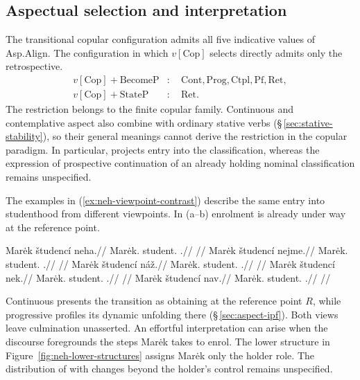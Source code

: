 \subsection{Aspectual selection and interpretation}
\label{sec:neh-selection}

The transitional copular configuration admits all five indicative values
of Asp.Align. The configuration in which $v[\mathrm{Cop}]$ selects
 directly admits only the retrospective.
\[
\begin{aligned}
 v[\mathrm{Cop}]+\mathrm{BecomeP}
   &:\quad \mathrm{Cont,Prog,Ctpl,Pf,Ret},\\
 v[\mathrm{Cop}]+\mathrm{StateP}
   &:\quad \mathrm{Ret}.
\end{aligned}
\]
The restriction belongs to the finite copular family. Continuous
and contemplative aspect also combine with ordinary stative verbs
(§\,\ref{sec:stative-stability}), so their general meanings cannot
derive the restriction in the copular paradigm. In particular,
 projects entry into the classification, whereas the expression
of prospective continuation of an already holding nominal classification
remains unspecified.

The examples in (\ref{ex:neh-viewpoint-contrast}) describe the same
entry into studenthood from different viewpoints. In (a--b) enrolment
is already under way at the reference point.

\pex\label{ex:neh-viewpoint-contrast}
\a
\begingl
\gla Marėk študencí neha.//
\glb Marėk.\Dir{} student.\Ind{} \Cop{}.\Cont{}//
\glft {}
//
\endgl
\a
\begingl
\gla Marėk študencí nejme.//
\glb Marėk.\Dir{} student.\Ind{} \Cop{}.\Prog{}//
\glft {}
//
\endgl
\a
\begingl
\gla Marėk študencí náž.//
\glb Marėk.\Dir{} student.\Ind{} \Cop{}.\Ctpl{}//
\glft {}
//
\endgl
\a
\begingl
\gla Marėk študencí nek.//
\glb Marėk.\Dir{} student.\Ind{} \Cop{}.\Pf{}//
\glft {}
//
\endgl
\a
\begingl
\gla Marėk študencí nav.//
\glb Marėk.\Dir{} student.\Ind{} \Cop{}.\Ret{}//
\glft {}
//
\endgl
\xe

\noindent Continuous  presents the transition as obtaining at
the reference point $R$, while progressive  profiles its
dynamic unfolding there (§\,\ref{sec:aspect-ipf}). Both views leave
culmination unasserted. An effortful interpretation can arise when
the discourse foregrounds the steps Marėk takes to enrol. The lower
structure in Figure~\ref{fig:neh-lower-structures} assigns Marėk only
the holder role. The distribution of  with changes beyond
the holder's control remains unspecified.

